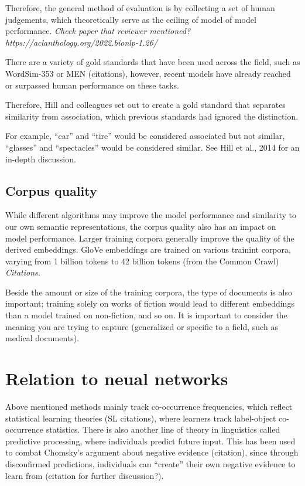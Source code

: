 Therefore, the general method of evaluation is by collecting a set of human judgements, which theoretically serve as the ceiling of model of model performance. \textit{Check paper that reviewer mentioned? https://aclanthology.org/2022.bionlp-1.26/}

There are a variety of gold standards that have been used across the field, such as WordSim-353 or MEN (citations), however, recent models have already reached or surpassed human performance on these tasks.

Therefore, Hill and colleagues set out to create a gold standard that separates similarity from association, which previous standards had ignored the distinction.

For example, ``car'' and ``tire'' would be considered associated but not similar, ``glasses'' and ``spectacles'' would be considered similar. See Hill et al., 2014 for an in-depth discussion.

\subsection{Corpus quality}

While different algorithms may improve the model performance and similarity to our own semantic representations, the corpus quality also has an impact on model performance.
Larger training corpora generally improve the quality of the derived embeddings. 
GloVe embeddings are trained on various trainint corpora, varying from 1 billion tokens to 42 billion tokens (from the Common Crawl) \textit{Citations.}

Beside the amount or size of the training corpora, the type of documents is also important; training solely on works of fiction would lead to different embeddings than a model trained on non-fiction, and so on. It is important to consider the meaning you are trying to capture (generalized or specific to a field, such as medical documents).

\section{Relation to neual networks}
Above mentioned methods mainly track co-occurrence frequencies, which reflect statistical learning theories (SL citations), where learners track label-object co-occurrence statistics.
There is also another line of theory in linguistics called predictive processing, where individuals predict future input. This has been used to combat Chomsky's argument about negative evidence (citation), since through disconfirmed predictions, individuals can ``create'' their own negative evidence to learn from (citation for further discussion?).


